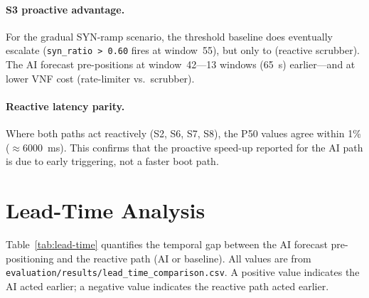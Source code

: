\paragraph{S3 proactive advantage.}
For the gradual SYN-ramp scenario, the threshold baseline does eventually
escalate (\texttt{syn\_ratio > 0.60} fires at window~55), but only to
 (reactive scrubber). The AI forecast pre-positions 
at window~42---13 windows (65~s) earlier---and at lower VNF cost
(rate-limiter vs.\ scrubber).

\paragraph{Reactive latency parity.}
Where both paths act reactively (S2, S6, S7, S8), the  P50
values agree within 1\% ($\approx 6000$~ms). This confirms that the
proactive speed-up reported for the AI path is due to early triggering,
not a faster boot path.

\section{Lead-Time Analysis}
\label{sec:lead-time}

Table~\ref{tab:lead-time} quantifies the temporal gap between the AI
forecast pre-positioning and the reactive path (AI or baseline). All
values are from \texttt{evaluation/results/lead\_time\_comparison.csv}.
A positive value indicates the AI acted earlier; a negative value
indicates the reactive path acted earlier.

